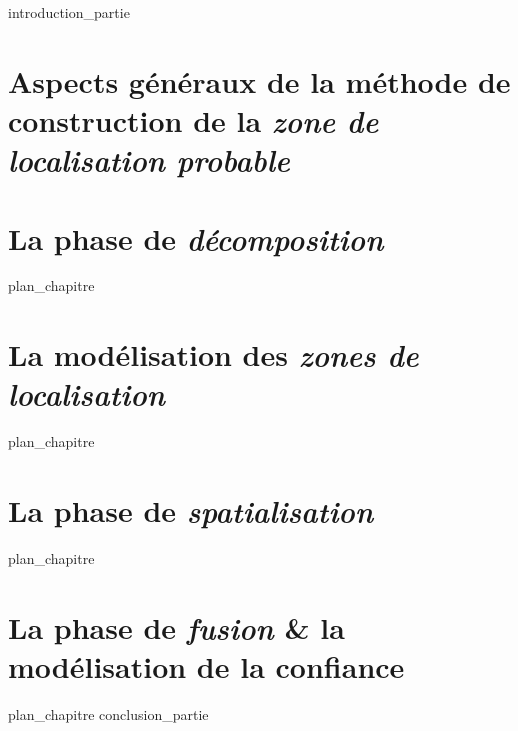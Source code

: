 \label{part:02_int}
{introduction_partie}
%
\chapter{Aspects généraux de la méthode de construction de la
  \emph{zone de localisation probable} }
\label{chap:04}
%
\chapter{La phase de \emph{décomposition} }
\label{chap:05}
{plan_chapitre}
%
\chapter{La modélisation des \emph{zones de localisation}}
\label{chap:06}
{plan_chapitre}
%
\chapter{La phase de \emph{spatialisation} }
\label{chap:07}
{plan_chapitre}
%
\chapter{La phase de \emph{fusion} \& la modélisation de la confiance
  }
\label{chap:08}
{plan_chapitre}
%
\label{part:02_cnc}
{conclusion_partie}
